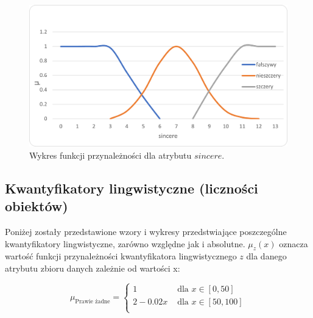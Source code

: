 \documentclass{classrep}
\begin{document}
\begin{enumerate}
  
  \begin{figure}[H]
    \includegraphics{fp_s.png}
    \caption{Wykres funkcji przynależności dla atrybutu \(sincere\).}
    \end{figure}

\end{enumerate}



\subsection{Kwantyfikatory lingwistyczne (liczności obiektów)}

Poniżej zostały przedstawione wzory i wykresy przedstwiające poszczególne kwantyfikatory lingwistyczne, zarówno względne jak i absolutne. 
\( \mu_z(x) \) oznacza wartość funkcji przynależności kwantyfikatora lingwistycznego \(z\) dla danego atrybutu zbioru danych zależnie od wartości x:

 \begin{equation}
    \mu_{\text{Prawie żadne}} = 
    \begin{cases}
        1 & \text{ dla } x \in [0,50] \\
        2 - 0.02x & \text{ dla } x \in [50,100] \\
      \end{cases}
  \end{equation}
\end{document}
